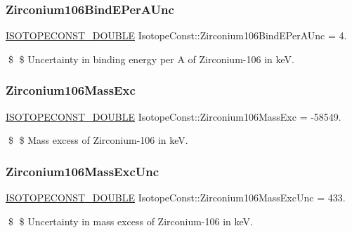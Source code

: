 \subsubsection{\texorpdfstring{Zirconium106\+Bind\+E\+Per\+A\+Unc}{Zirconium106BindEPerAUnc}}
{\footnotesize\ttfamily \mbox{\hyperlink{group___isotope_const-_macros_ga8f45a7272ce02c0b4c65c44636ed719a}{I\+S\+O\+T\+O\+P\+E\+C\+O\+N\+S\+T\+\_\+\+D\+O\+U\+B\+LE}} Isotope\+Const\+::\+Zirconium106\+Bind\+E\+Per\+A\+Unc = 4.}

\$ \$ Uncertainty in binding energy per A of Zirconium-\/106 in keV. \mbox{\label{group___isotope_const-_zirconium-_zr106_ga0ae2711e6a9c9052a96727241bb88edd}} 
\subsubsection{\texorpdfstring{Zirconium106\+Mass\+Exc}{Zirconium106MassExc}}
{\footnotesize\ttfamily \mbox{\hyperlink{group___isotope_const-_macros_ga8f45a7272ce02c0b4c65c44636ed719a}{I\+S\+O\+T\+O\+P\+E\+C\+O\+N\+S\+T\+\_\+\+D\+O\+U\+B\+LE}} Isotope\+Const\+::\+Zirconium106\+Mass\+Exc = -\/58549.}

\$ \$ Mass excess of Zirconium-\/106 in keV. \mbox{\label{group___isotope_const-_zirconium-_zr106_gad6d9c26e31bd973c6ae59244b46f261e}} 
\subsubsection{\texorpdfstring{Zirconium106\+Mass\+Exc\+Unc}{Zirconium106MassExcUnc}}
{\footnotesize\ttfamily \mbox{\hyperlink{group___isotope_const-_macros_ga8f45a7272ce02c0b4c65c44636ed719a}{I\+S\+O\+T\+O\+P\+E\+C\+O\+N\+S\+T\+\_\+\+D\+O\+U\+B\+LE}} Isotope\+Const\+::\+Zirconium106\+Mass\+Exc\+Unc = 433.}

\$ \$ Uncertainty in mass excess of Zirconium-\/106 in keV. \mbox{\label{group___isotope_const-_zirconium-_zr106_gaa1214cfedeafaee91ffdf6cbdd7ec228}} 
